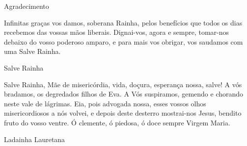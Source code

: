 \begin{center}
    Agradecimento
\end{center}
\begin{flushleft}
    Infinitas graças vos damos, soberana Rainha, pelos benefícios que todos os dias recebemos das vossas mãos liberais. Dignai-vos, agora e sempre, tomar-nos debaixo do vosso poderoso amparo, e para mais vos obrigar, vos saudamos com uma Salve Rainha.
\end{flushleft}
\begin{center}
    Salve Rainha
\end{center}
\begin{flushleft}
    Salve Rainha, Mãe de misericórdia, vida, doçura, esperança nossa, salve! A vós bradamos, os degredados filhos de Eva. A Vós suspiramos, gemendo e chorando neste vale de lágrimas. Eia, pois advogada nossa, esses vossos olhos misericordiosos a nós volvei, e depois deste desterro mostrai-nos Jesus, bendito fruto do vosso ventre. Ó clemente, ó piedosa, ó doce sempre Virgem Maria.
\end{flushleft}
\newpage
\begin{center}
    Ladainha Lauretana
\end{center}
